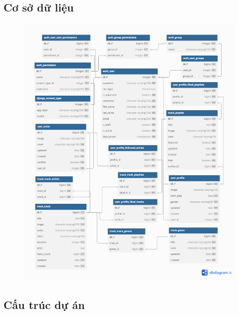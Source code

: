\documentclass[a4paper]{article}
\begin{document}
\subsection{Cơ sở dữ liệu}
\begin{figure}[h!]
\begin{center}
\includegraphics[width=12cm]{db.png}
\end{center}
\end{figure}
\newpage

\subsection{Cấu trúc dự án}
\end{document}

